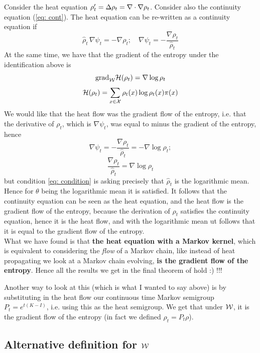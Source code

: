 Consider the heat equation $\rho'_t=\Delta \rho_t = \nabla \cdot \nabla \rho_t$. Consider also the continuity equation (\ref{eq: cont}). The heat equation can be re-written as a continuity equation if
\[
\hat\rho_t\,\nabla\psi_t=-\nabla\rho_t; \quad \nabla\psi_t=-\frac{\nabla\rho_t}{\hat\rho_t}
\]
At the same time, we have that the gradient of the entropy under the identification above is 
\[
\text{grad}_{\mathcal{W}} \mathcal{H}(\rho_t)=\nabla \log \rho_t
\]
\[
\mathcal{H}(\rho_t) = \sum_{x\in\mathcal{X}}\rho_t(x) \log \rho_t(x) \pi (x)
\]
We would like that the heat flow was the gradient flow of the entropy, i.e. that the derivative of $\rho_t$, which is $\nabla \psi_t$, was equal to minus the gradient of the entropy, hence
\[
\nabla \psi_t = -\frac{\nabla\rho_t}{\hat\rho_t} = -\nabla \log \rho_t;
\]
\begin{equation}\label{eq: condition}
    \frac{\nabla\rho_t}{\hat\rho_t} = \nabla \log \rho_t
\end{equation}
but condition \ref{eq: condition} is asking precisely that $\hat\rho_t$ is the logarithmic mean. Hence for $\theta$ being the logarithmic mean it is satisfied. It follows that the continuity equation can be seen as the heat equation, and the heat flow is the gradient flow of the entropy, because the derivation of $\rho_t$ satisfies the continuity equation, hence it is the heat flow, and with the logarithmic mean ut follows that it is equal to the gradient flow of the entropy. 
\\

What we have found is that \textbf{the heat equation with a Markov kernel}, which is equivalent to considering the \emph{flow} of a Markov chain, like instead of heat propagating we look at a Markov chain evolving, \textbf{is the gradient flow of the entropy}. Hence all the results we get in the final theorem of \cite{brue} hold :) !!!

Another way to look at this (which is what I wanted to say above) is by substituting in the heat flow our continuous time Markov semigroup $P_t = e^{t(K-I)}$, i.e. using this as the heat semigroup. We get that under $\mathcal{W}$, it is the gradient flow of the entropy (in fact we defined $\rho_t=P_t\rho$). 


\subsection{Alternative definition for $\mathcal{W}$}

